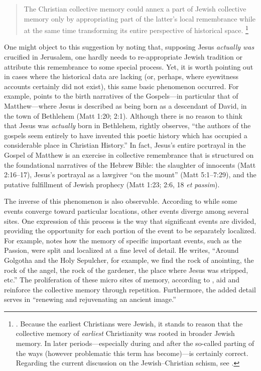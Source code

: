 \begin{quote}
    The Christian collective memory could annex a part of Jewish collective memory only by appropriating part of the latter's local remembrance while at the same time transforming its entire perspective of historical space.%
        \footnote{%
        \Cite[215]{halbwachs1992}.
        Because the earliest Christians were Jewish, it stands to reason that the collective memory of \emph{earliest} Christianity was rooted in broader Jewish memory. In later periods---especially during and after the so-called parting of the ways (however problematic this term has become)---\halbwachs is certainly correct. Regarding the current discussion on the Jewish--Christian schism, see 
        \cite[19--60]{burns2016}.}
\end{quote}  
\noindent
One might object to this suggestion by noting that, supposing Jesus \emph{actually was} crucified in Jerusalem, one hardly needs to re-appropriate Jewish tradition or attribute this remembrance to some special process. Yet, it is worth pointing out in cases where the historical data are lacking (or, perhaps, where eyewitness accounts certainly did not exist), this same basic phenomenon occurred. For example, \halbwachs points to the birth narratives of the Gospels---in particular that of Matthew---where Jesus is described as being born as a descendant of David, in the town of Bethlehem (Matt 1:20; 2:1). Although there is no reason to think that Jesus was \emph{actually} born in Bethlehem, \halbwachs rightly observes, ``the authors of the gospels seem entirely to have invented this poetic history which has occupied a considerable place in Christian History.''%
    \autocite[214]{halbwachs1992}
In fact, Jesus's entire portrayal in the Gospel of Matthew is an exercise in collective remembrance that is structured on the foundational narratives of the Hebrew Bible: the slaughter of innocents (Matt 2:16--17), Jesus's portrayal as a lawgiver ``on the mount'' (Matt 5:1--7:29), and the putative fulfillment of Jewish prophecy (Matt 1:23; 2:6, 18 \emph{et passim}). 

The inverse of this phenomenon is also observable. According to \halbwachs while some events converge toward particular locations, other events diverge among several sites. One expression of this process is the way that significant events are divided, providing the opportunity for each portion of the event to be separately localized. For example, \halbwachs notes how the memory of specific important events, such as the Passion, were split and localized at a fine level of detail. He writes, ``Around Golgotha and the Holy Sepulcher, for example, we find the rock of anointing, the rock of the angel, the rock of the gardener, the place where Jesus was stripped, etc.''%
        \autocite[220]{halbwachs1992}
The proliferation of these micro sites of memory, according to \halbwachs, aid and reinforce the collective memory through repetition. Furthermore, the added detail serves in ``renewing and rejuvenating an ancient image.''%
    \autocite[220]{halbwachs1992}  

